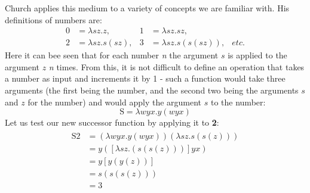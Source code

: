 \documentclass {article}
\begin{document}
Church applies this medium to a variety of concepts we are familiar with. His definitions of numbers are:
\begin{equation*}
\begin{aligned}
\bm{\mathrm{0}} &= \lambda sz.z,
  & %
\bm{\mathrm{1}} &= \lambda sz.sz,
  \\
\bm{\mathrm{2}} &= \lambda sz.s(sz),
  &
\bm{\mathrm{3}} &= \lambda sz.s(s(sz)),
  &
etc.
\end{aligned}
\end{equation*}
Here it can bee seen that for each number \textit{n} the argument $s$  is applied to the argument $z$ \textit{n} times.
From this, it is not difficult to define an operation that takes a number as input and increments it by 1 - such a function would take three arguments (the first being the number, and the second two being the arguments $s$ and $z$ for the number) and would apply the argument $s$ to the number:
\begin{equation*}
\bm{\mathrm{S}} = \lambda wyx.y(wyx)
\end{equation*}
Let us test our new successor function by applying it to \textbf{2}:
\begin{gather*}
\begin{aligned}
\bm{\mathrm{S2}} &= (\lambda wyx.y(wyx)) (\lambda sz.s(s(z)))\\
&= y([\lambda sz.(s(s(z)))]yx)\\
&=y[y(y(z))]\\
&=s(s(s(z)))\\
&=\bm{\mathrm{3}}
\end{aligned}
\end{gather*}
\end{document}
